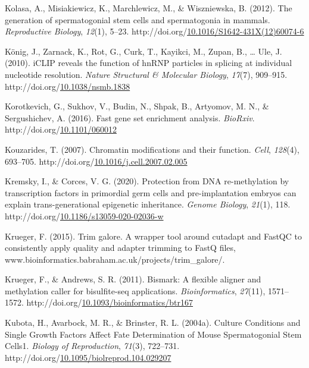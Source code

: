 \documentclass[12pt,twoside]{reedthesis}
\newlength{\cslhangindent}
\newenvironment{CSLReferences}[2] %
 {%
  \setlength{\parindent}{0pt}
  \ifodd #1 \everypar{\setlength{\hangindent}{\cslhangindent}}\ignorespaces\fi
  \ifnum #2 > 0
  \setlength{\parskip}{#2\baselineskip}
  \fi
 }%
 {}
\begin{document}
\begin{CSLReferences}{1}{0}
\leavevmode{}%
Kolasa, A., Misiakiewicz, K., Marchlewicz, M., \& Wiszniewska, B. (2012). The generation of spermatogonial stem cells and spermatogonia in mammals. \emph{Reproductive Biology}, \emph{12}(1), 5--23. http://doi.org/\href{https://doi.org/10.1016/S1642-431X(12)60074-6}{10.1016/S1642-431X(12)60074-6}

\leavevmode{}%
König, J., Zarnack, K., Rot, G., Curk, T., Kayikci, M., Zupan, B., \ldots{} Ule, J. (2010). iCLIP reveals the function of hnRNP particles in splicing at individual nucleotide resolution. \emph{Nature Structural \& Molecular Biology}, \emph{17}(7), 909--915. http://doi.org/\href{https://doi.org/10.1038/nsmb.1838}{10.1038/nsmb.1838}

\leavevmode{}%
Korotkevich, G., Sukhov, V., Budin, N., Shpak, B., Artyomov, M. N., \& Sergushichev, A. (2016). Fast gene set enrichment analysis. \emph{BioRxiv}. http://doi.org/\href{https://doi.org/10.1101/060012}{10.1101/060012}

\leavevmode{}%
Kouzarides, T. (2007). Chromatin modifications and their function. \emph{Cell}, \emph{128}(4), 693--705. http://doi.org/\href{https://doi.org/10.1016/j.cell.2007.02.005}{10.1016/j.cell.2007.02.005}

\leavevmode{}%
Kremsky, I., \& Corces, V. G. (2020). Protection from DNA re-methylation by transcription factors in primordial germ cells and pre-implantation embryos can explain trans-generational epigenetic inheritance. \emph{Genome Biology}, \emph{21}(1), 118. http://doi.org/\href{https://doi.org/10.1186/s13059-020-02036-w}{10.1186/s13059-020-02036-w}

\leavevmode{}%
Krueger, F. (2015). Trim galore. A wrapper tool around cutadapt and FastQC to consistently apply quality and adapter trimming to FastQ files, www.bioinformatics.babraham.ac.uk/projects/trim{\_}galore/.

\leavevmode{}%
Krueger, F., \& Andrews, S. R. (2011). Bismark: A flexible aligner and methylation caller for bisulfite-seq applications. \emph{Bioinformatics}, \emph{27}(11), 1571--1572. http://doi.org/\href{https://doi.org/10.1093/bioinformatics/btr167}{10.1093/bioinformatics/btr167}

\leavevmode{}%
Kubota, H., Avarbock, M. R., \& Brinster, R. L. (2004a). Culture Conditions and Single Growth Factors Affect Fate Determination of Mouse Spermatogonial Stem Cells1. \emph{Biology of Reproduction}, \emph{71}(3), 722--731. http://doi.org/\href{https://doi.org/10.1095/biolreprod.104.029207}{10.1095/biolreprod.104.029207}


\end{CSLReferences}
\end{document}
